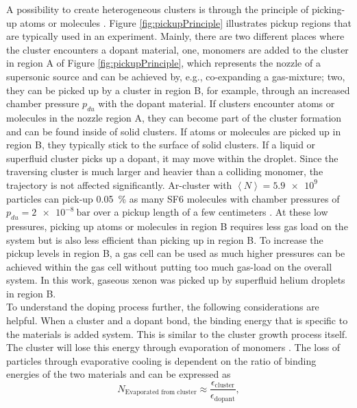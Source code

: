 A possibility to create heterogeneous clusters is through the principle of picking-up atoms or molecules \citep{Haberland-1994-Springer}. Figure \ref{fig:pickupPrinciple} illustrates pickup regions that are typically used in an experiment. Mainly, there are two different places where the cluster encounters a dopant material, one, monomers are added to the cluster in region A of Figure \ref{fig:pickupPrinciple}, which represents the nozzle of a supersonic source and can be achieved by, e.g., co-expanding a gas-mixture; two, they can be picked up by a cluster in region B, for example, through an increased chamber pressure $p_{du}$ with the dopant material. If clusters encounter atoms or molecules in the nozzle region A, they can become part of the cluster formation and can be found inside of solid clusters. If atoms or molecules are picked up in region B, they typically stick to the surface of solid clusters. If a liquid or superfluid cluster picks up a dopant, it may move within the droplet. Since the traversing cluster is much larger and heavier than a colliding monomer, the trajectory is not affected significantly. Ar-cluster with $\left\langle N\right\rangle = \num{5.9e9}$ particles can pick-up \SI{0.05}{\percent} as many SF6 molecules with chamber pressures of $p_{du}=\SI{2e-8}{\bar}$ over a pickup length of a few centimeters \citep{Gough-1985-JChemPhys}. At these low pressures, picking up atoms or molecules in region B requires less gas load on the system but is also less efficient than picking up in region B. To increase the pickup levels in region B, a gas cell can be used as much higher pressures can be achieved within the gas cell without putting too much gas-load on the overall system. In this work, gaseous xenon was picked up by superfluid helium droplets in region B.\\[1\baselineskip]
%
To understand the doping process further, the following considerations are helpful. When a cluster and a dopant bond, the binding energy that is specific to the materials is added system. This is similar to the cluster growth process itself. The cluster will lose this energy through evaporation of monomers \citep{Gomez-2011-JCP}. The loss of particles through evaporative cooling is dependent on the ratio of binding energies of the two materials and can be expressed as
\begin{equation}
N_{\text{Evaporated from cluster}} \approx \frac{\epsilon_{\text{cluster}}}{\epsilon_{\text{dopant}}},
\label{eq:evaporated-amount}
\end{equation}
